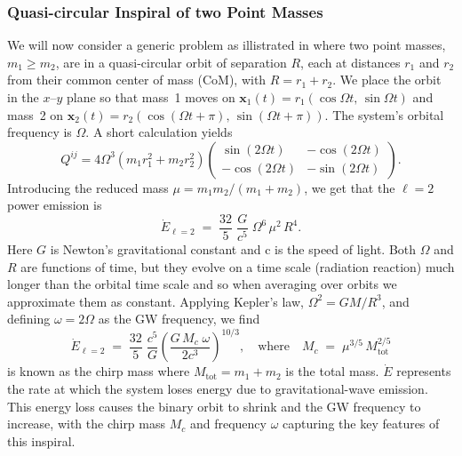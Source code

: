 \documentclass[12pt]{article}
\begin{document}
\subsubsection{Quasi-circular Inspiral of two Point Masses}
\label{subsec:two_mass_example}
We will now consider a generic problem as illistrated in \cite{intoGRSarp} where two point masses, \(m_1 \ge m_2\), are in a quasi-circular orbit of separation \(R\),
each at distances \(r_1\) and \(r_2\) from their common center of mass (CoM), with
\(R = r_1 + r_2\). We place the orbit in the \(x\)--\(y\) plane so that mass~1 moves on
\(\mathbf{x}_1(t) = r_1(\cos\Omega t,\,\sin\Omega t)\) and mass~2 on
\(\mathbf{x}_2(t) = r_2(\cos(\Omega t+\pi),\,\sin(\Omega t+\pi))\). The system’s orbital
frequency is \(\Omega\). A short calculation yields
%
\begin{equation}
    Q^{ij} = 4 \Omega^3 \left(m_1 r_1^2 + m_2 r_2^2\right)
    \begin{pmatrix}
    \sin(2\Omega t) & -\cos(2\Omega t) \\
    -\cos(2\Omega t) & -\sin(2\Omega t)
    \end{pmatrix}.
\end{equation}
%
%
Introducing the reduced mass \(\mu = m_1 m_2/(m_1 + m_2)\), we get that the \(\ell=2\) power emission is
%
\begin{equation}\label{eq:E_dot_2}
\dot{E}_{\ell=2}
\;=\;
\frac{32}{5}\;\frac{G}{c^5}\;\Omega^6\,\mu^2\,R^4.
\end{equation}
Here \(G\) is Newton's gravitational constant and c is the speed of light. Both \(\Omega\) and \(R\) are functions of time, but they evolve on a time scale (radiation reaction) much longer than the orbital time
scale and so when averaging over orbits we approximate them as constant. Applying Kepler’s law, \(\Omega^2 = GM/R^3\), and defining
\(\omega = 2\Omega\) as the GW frequency, we find
%
%
\begin{equation}
\dot{E}_{\ell=2}
\;=\;
\frac{32}{5}\;\frac{c^5}{G}
\left(\frac{G\, M_c \;\omega}{2c^3}\right)^{10/3},
\quad
\text{where}
\quad
M_c \;=\;\mu^{3/5}\,M_{\text{tot}}^{2/5}
\label{eq:Energy}
\end{equation}
%
is known as the chirp mass where $M_{\text{tot}} = m_1+m_2$ is the total mass.
%
%
$ \dot{E} $ represents the rate at which the system loses energy due to gravitational-wave emission.
This energy loss causes the binary orbit to shrink and the GW frequency to increase, 
with the chirp mass \(M_c\) and frequency \(\omega\) capturing the key features of this inspiral.
%
\end{document}
